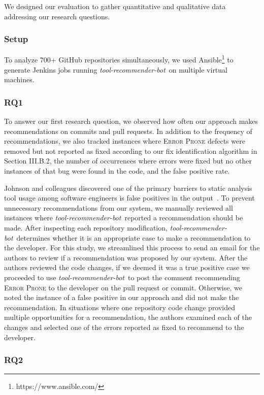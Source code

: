 \documentclass[sigconf,review,anonymous]{acmart}
\newcommand{\tool}{\textsl{tool-recommender-bot}}
\begin{document}
We designed our evaluation to gather quantitative and qualitative data addressing our research questions.  

\subsubsection{Setup}

To analyze 700+ GitHub repositories simultaneously, we used Ansible\footnote{https://www.ansible.com/} to generate Jenkins jobs running \tool~on multiple virtual machines.

\subsubsection{RQ1}

To answer our first research question, we observed how often our approach makes recommendations on commits and pull requests. In addition to the frequency of recommendations, we also tracked instances where \textsc{Error Prone} defects were removed but not reported as fixed according to our fix identification algorithm in Section III.B.2, the number of occurrences where errors were fixed but no other instances of that bug were found in the code, and the false positive rate.

Johnson and colleagues discovered one of the primary barriers to static analysis tool usage among software engineers is false positives in the output~\cite{Johnson2013Why}. To prevent unnecessary recommendations from our system, we manually reviewed all instances where \tool~reported a recommendation should be made. After inspecting each repository modification, \tool~determines whether it is an appropriate case to make a recommendation to the developer. For this study, we streamlined this process to send an email for the authors to review if a recommendation was proposed by our system. After the authors reviewed the code changes, if we deemed it was a true positive case we proceeded to use \tool~to post the comment recommending \textsc{Error Prone} to the developer on the pull request or commit. Otherwise, we noted the instance of a false positive in our approach and did not make the recommendation. In situations where one repository code change provided multiple opportunities for a recommendation, the authors examined each of the changes and selected one of the errors reported as fixed to recommend to the developer.

\subsubsection{RQ2}
\end{document}
